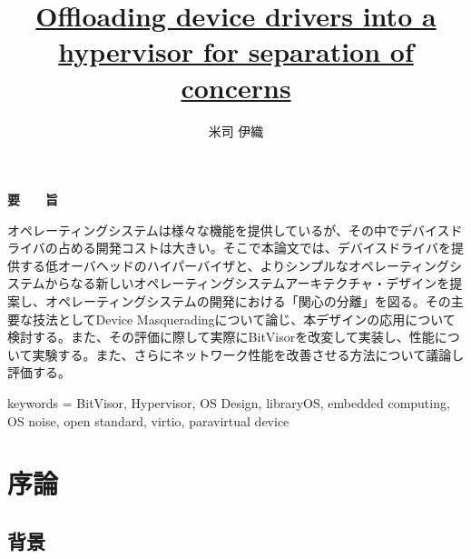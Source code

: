 \documentclass[a4paper,11pt,report]{ltjsbook}
\title{\uline{Offloading device drivers into a hypervisor for separation of concerns}}
\author{米司 伊織}
\begin{document}
\thispagestyle{empty}
\newpage
\thispagestyle{empty}
\begin{minipage}{.8\hsize}
\thispagestyle{empty}
\maketitle
\end{minipage}
\thispagestyle{empty}
\newpage

\thispagestyle{empty}
\vspace*{20pt plus 1fil}
\noindent
\begin{center}
{\Large \bf 要　　旨}
\vspace{2cm}
\end{center}

オペレーティングシステムは様々な機能を提供しているが、その中でデバイスドライバの占める開発コストは大きい。そこで本論文では、デバイスドライバを提供する低オーバヘッドのハイパーバイザと、よりシンプルなオペレーティングシステムからなる新しいオペレーティングシステムアーキテクチャ・デザインを提案し、オペレーティングシステムの開発における「関心の分離」を図る。その主要な技法としてDevice Masqueradingについて論じ、本デザインの応用について検討する。また、その評価に際して実際にBitVisorを改変して実装し、性能について実験する。また、さらにネットワーク性能を改善させる方法について議論し評価する。

keywords = {BitVisor, Hypervisor, OS Design, libraryOS, embedded computing, OS noise, open standard, virtio, paravirtual device}


\par
\vspace{0pt plus 1fil}
\newpage

\tableofcontents
\listoffigures

\pagebreak \setcounter{page}{1}



\chapter{序論}

\section{背景}
\end{document}
